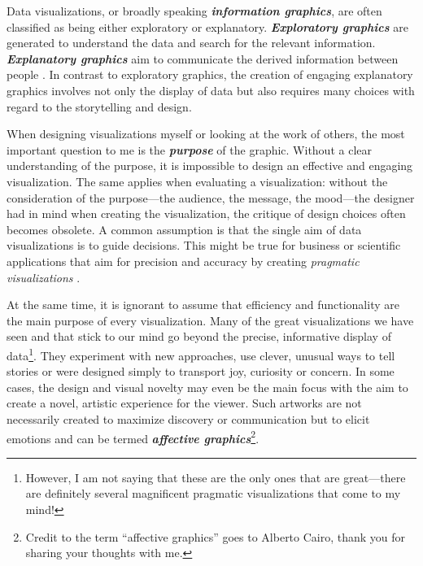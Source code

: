 \documentclass[
]{krantz}
\begin{document}
Data visualizations, or broadly speaking \textbf{\emph{information graphics}}, are often classified as being either exploratory or explanatory. \textbf{\emph{Exploratory graphics}} are generated to understand the data and search for the relevant information. \textbf{\emph{Explanatory graphics}} aim to communicate the derived information between people \citep{koponen&hilden2019}. In contrast to exploratory graphics, the creation of engaging explanatory graphics involves not only the display of data but also requires many choices with regard to the storytelling and design.

When designing visualizations myself or looking at the work of others, the most important question to me is the \textbf{\emph{purpose}} of the graphic. Without a clear understanding of the purpose, it is impossible to design an effective and engaging visualization. The same applies when evaluating a visualization: without the consideration of the purpose---the audience, the message, the mood---the designer had in mind when creating the visualization, the critique of design choices often becomes obsolete. A common assumption is that the single aim of data visualizations is to guide decisions. This might be true for business or scientific applications that aim for precision and accuracy by creating \emph{pragmatic visualizations} \citep{kosara2007}.

At the same time, it is ignorant to assume that efficiency and functionality are the main purpose of every visualization. Many of the great visualizations we have seen and that stick to our mind go beyond the precise, informative display of data\footnote{However, I am not saying that these are the only ones that are great---there are definitely several magnificent pragmatic visualizations that come to my mind!}. They experiment with new approaches, use clever, unusual ways to tell stories or were designed simply to transport joy, curiosity or concern. In some cases, the design and visual novelty may even be the main focus with the aim to create a novel, artistic experience for the viewer. Such artworks are not necessarily created to maximize discovery or communication but to elicit emotions and can be termed \textbf{\emph{affective graphics}}\footnote{Credit to the term ``affective graphics'' goes to Alberto Cairo, thank you for sharing your thoughts with me.}.
\end{document}
